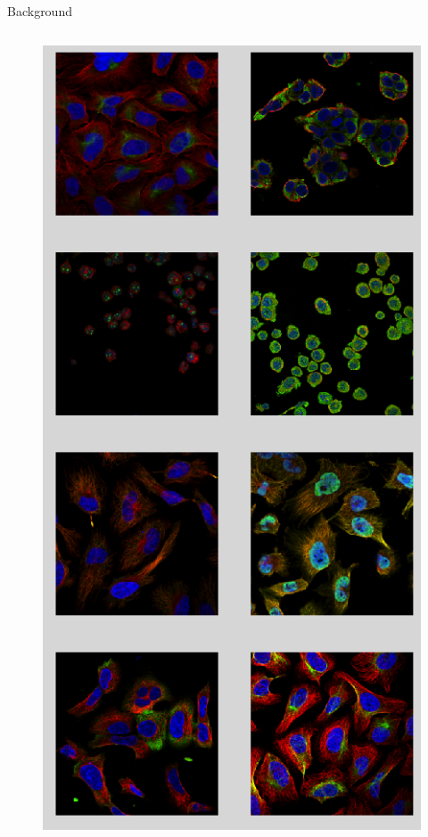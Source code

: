 \documentclass[unknownkeysallowed]{beamer}
\begin{document}
\begin{frame}{Background}
	\begin{columns}
		\begin{column}{0.3\paperwidth}
		\begin{figure}
			\includegraphics[width=0.25\paperwidth,height=0.6\paperheight]{images/background_1}
		\end{figure}
		\end{column}
		

\end{columns}
\end{frame}
\end{document}
